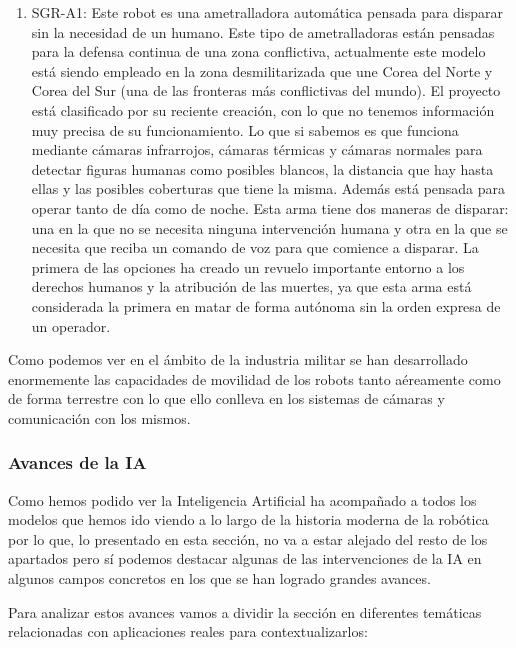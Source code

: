 \begin{enumerate}
  \item SGR-A1: Este robot es una ametralladora automática pensada para disparar sin la necesidad de un humano. Este tipo de ametralladoras están pensadas para la defensa continua de una zona conflictiva, actualmente este modelo está siendo empleado en la zona desmilitarizada que une Corea del Norte y Corea del Sur (una de las fronteras más conflictivas del mundo). El proyecto está clasificado por su reciente creación, con lo que no tenemos información muy precisa de su funcionamiento. Lo que si sabemos es que funciona mediante cámaras infrarrojos, cámaras térmicas y cámaras normales para detectar figuras humanas como posibles blancos, la distancia que hay hasta ellas y las posibles coberturas que tiene la misma. Además está pensada para operar tanto de día como de noche. Esta arma tiene dos maneras de disparar: una en la que no se necesita ninguna intervención humana y otra en la que se necesita que reciba un comando de voz para que comience a disparar. La primera de las opciones ha creado un revuelo importante entorno a los derechos humanos y la atribución de las muertes, ya que esta arma está considerada la primera en matar de forma autónoma sin la orden expresa de un operador.
\end{enumerate}

Como podemos ver en el ámbito de la industria militar se han desarrollado enormemente las capacidades de movilidad de los robots tanto aéreamente como de forma terrestre con lo que ello conlleva en los sistemas de cámaras y comunicación con los mismos.

\subsubsection{Avances de la IA}
Como hemos podido ver la Inteligencia Artificial ha acompañado a todos los modelos que hemos ido viendo a lo largo de la historia moderna de la robótica por lo que, lo presentado en esta sección, no va a estar alejado del resto de los apartados pero sí podemos destacar algunas de las intervenciones de la IA en algunos campos concretos en los que se han logrado grandes avances.

Para analizar estos avances vamos a dividir la sección en diferentes temáticas relacionadas con aplicaciones reales para contextualizarlos:

